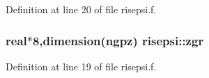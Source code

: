 Definition at line 20 of file risepsi.f.\hypertarget{namespacerisepsi_0634f432b4995d66062308d5613c7fc5}{
\subsubsection[zgr]{\setlength{\rightskip}{0pt plus 5cm}real$\ast$8,dimension(ngpz) {\bf risepsi::zgr}}}
\label{namespacerisepsi_0634f432b4995d66062308d5613c7fc5}




Definition at line 19 of file risepsi.f.